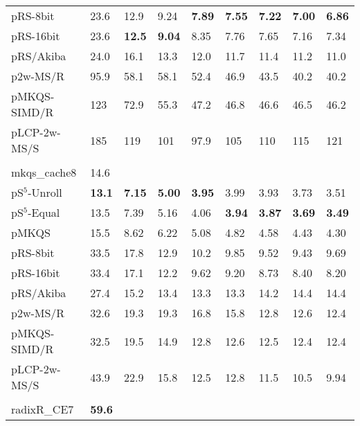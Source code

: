 \documentclass[a4paper]{myjournal}
\begin{document}
\begin{table}
\begin{tabularx}{\linewidth}{l|*{8}{>{\hfill}X}|@{}}
     pRS-8bit & 23.6 &     12.9 &     9.24 & \bf 7.89 & \bf 7.55 & \bf 7.22 & \bf 7.00 & \bf 6.86 \\
    pRS-16bit & 23.6 & \bf 12.5 & \bf 9.04 &     8.35 &     7.76 &     7.65 &     7.16 &     7.34 \\
    pRS/Akiba & 24.0 &     16.1 &     13.3 &     12.0 &     11.7 &     11.4 &     11.2 &     11.0 \\
     p2w-MS/R & 95.9 &     58.1 &     58.1 &     52.4 &     46.9 &     43.5 &     40.2 &     40.2 \\
 pMKQS-SIMD/R &  123 &     72.9 &     55.3 &     47.2 &     46.8 &     46.6 &     46.5 &     46.2 \\
 pLCP-2w-MS/S &  185 &      119 &      101 &     97.9 &      105 &      110 &      115 &      121 \\ \hline
& \multicolumn{8}{l|}{\textbf{GOV2}, $n = 80\,\text{M}$, $N = 4\,\text{Gi}$, $\frac{D}{N} = 69.8\,\%$} \\ \cline{2-9}
mkqs\_cache8 & 14.6 &  &  &  &  &  &  &  \\
pS$^5$-Unroll & \bf 13.1 & \bf 7.15 & \bf 5.00 & \bf 3.95 &     3.99 &     3.93 &     3.73 &     3.51 \\
 pS$^5$-Equal &     13.5 &     7.39 &     5.16 &     4.06 & \bf 3.94 & \bf 3.87 & \bf 3.69 & \bf 3.49 \\
        pMKQS &     15.5 &     8.62 &     6.22 &     5.08 &     4.82 &     4.58 &     4.43 &     4.30 \\
     pRS-8bit &     33.5 &     17.8 &     12.9 &     10.2 &     9.85 &     9.52 &     9.43 &     9.69 \\
    pRS-16bit &     33.4 &     17.1 &     12.2 &     9.62 &     9.20 &     8.73 &     8.40 &     8.20 \\
    pRS/Akiba &     27.4 &     15.2 &     13.4 &     13.3 &     13.3 &     14.2 &     14.4 &     14.4 \\
     p2w-MS/R &     32.6 &     19.3 &     19.3 &     16.8 &     15.8 &     12.8 &     12.6 &     12.4 \\
 pMKQS-SIMD/R &     32.5 &     19.5 &     14.9 &     12.8 &     12.6 &     12.5 &     12.4 &     12.4 \\
 pLCP-2w-MS/S &     43.9 &     22.9 &     15.8 &     12.5 &     12.8 &     11.5 &     10.5 &     9.94 \\ \hline
& \multicolumn{8}{l|}{\textbf{Wikipedia}, $n = N = 256\,\text{Mi}$, $D = 13.8\,\text{G}$} \\ \cline{2-9}
radixR\_CE7 & \bf 59.6 &  &  &  &  &  &  &  \\

\end{tabularx}
\end{table}
\end{document}
